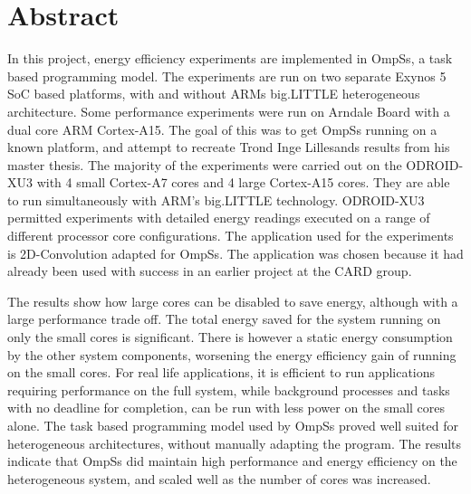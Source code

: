 \section*{Abstract}
In this project, energy efficiency experiments are implemented in OmpSs, a task based programming model.
The experiments are run on two separate Exynos 5 SoC based platforms, with and without ARMs big.LITTLE heterogeneous architecture.
Some performance experiments were run on Arndale Board with a dual core ARM Cortex-A15.
The goal of this was to get OmpSs running on a known platform, and attempt to recreate Trond Inge Lillesands results from his master thesis.
The majority of the experiments were carried out on the ODROID-XU3 with 4 small Cortex-A7 cores and 4 large Cortex-A15 cores.
They are able to run simultaneously with ARM's big.LITTLE technology.
ODROID-XU3 permitted experiments with detailed energy readings executed on a range of different processor core configurations.
The application used for the experiments is 2D-Convolution adapted for OmpSs.
The application was chosen because it had already been used with success in an earlier project at the CARD group.

The results show how large cores can be disabled to save energy, although with a large performance trade off.
The total energy saved for the system running on only the small cores is significant.
There is however a static energy consumption by the other system components, worsening the energy efficiency gain of running on the small cores.
For real life applications, it is efficient to run applications requiring performance on the full system, while background processes and tasks with no deadline for completion, can be run with less power on the small cores alone.
The task based programming model used by OmpSs proved well suited for heterogeneous architectures, without manually adapting the program.
The results indicate that OmpSs did maintain high performance and energy efficiency on the heterogeneous system, and scaled well as the number of cores was increased.
